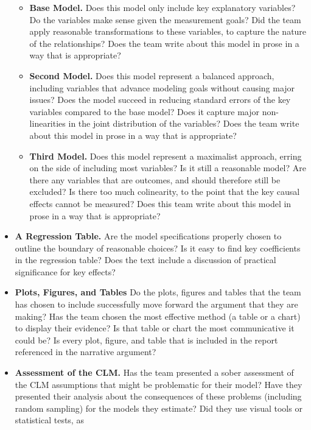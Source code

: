 \documentclass[
]{article}
\providecommand{\tightlist}{%
  \setlength{\itemsep}{0pt}\setlength{\parskip}{0pt}}
\begin{document}
\begin{itemize}
  \begin{itemize}
  \tightlist
  \item
    \textbf{Base Model.} Does this model only include key explanatory
    variables? Do the variables make sense given the measurement goals?
    Did the team apply reasonable transformations to these variables, to
    capture the nature of the relationships? Does the team write about
    this model in prose in a way that is appropriate?
  \item
    \textbf{Second Model.} Does this model represent a balanced
    approach, including variables that advance modeling goals without
    causing major issues? Does the model succeed in reducing standard
    errors of the key variables compared to the base model? Does it
    capture major non-linearities in the joint distribution of the
    variables? Does the team write about this model in prose in a way
    that is appropriate?
  \item
    \textbf{Third Model.} Does this model represent a maximalist
    approach, erring on the side of including most variables? Is it
    still a reasonable model? Are there any variables that are outcomes,
    and should therefore still be excluded? Is there too much
    colinearity, to the point that the key causal effects cannot be
    measured? Does this team write about this model in prose in a way
    that is appropriate?
  \end{itemize}
\item
  \textbf{A Regression Table.} Are the model specifications properly
  chosen to outline the boundary of reasonable choices? Is it easy to
  find key coefficients in the regression table? Does the text include a
  discussion of practical significance for key effects?
\item
  \textbf{Plots, Figures, and Tables} Do the plots, figures and tables
  that the team has chosen to include successfully move forward the
  argument that they are making? Has the team chosen the most effective
  method (a table or a chart) to display their evidence? Is that table
  or chart the most communicative it could be? Is every plot, figure,
  and table that is included in the report referenced in the narrative
  argument?
\item
  \textbf{Assessment of the CLM.} Has the team presented a sober
  assessment of the CLM assumptions that might be problematic for their
  model? Have they presented their analysis about the consequences of
  these problems (including random sampling) for the models they
  estimate? Did they use visual tools or statistical tests, as

\end{itemize}
\end{document}
